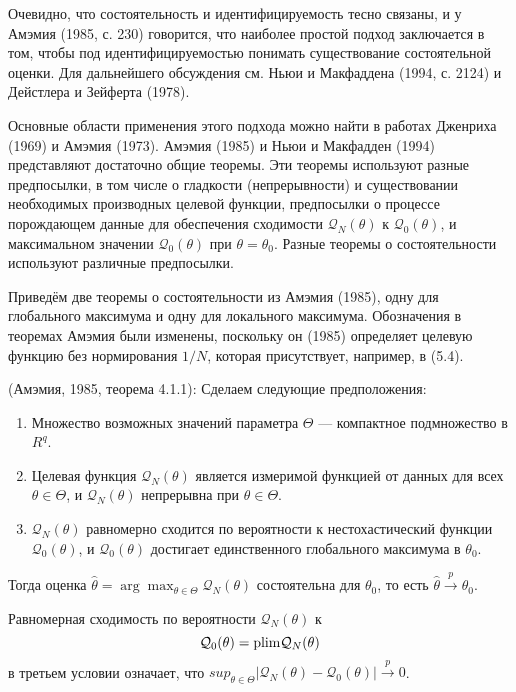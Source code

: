 Очевидно, что состоятельность и идентифицируемость тесно связаны, и у Амэмия (1985, с. 230) говорится, что наиболее простой подход заключается в том, чтобы под идентифицируемостью понимать существование состоятельной оценки. Для дальнейшего обсуждения см. Ньюи и Макфаддена (1994, с. 2124) и Дейстлера и Зейферта (1978).

Основные области применения этого подхода можно найти в работах Дженриха (1969) и Амэмия (1973). Амэмия (1985) и Ньюи и Макфадден (1994) представляют достаточно общие теоремы. Эти теоремы используют разные предпосылки, в том числе о гладкости (непрерывности) и существовании необходимых производных целевой функции, предпосылки о процессе порождающем данные для обеспечения сходимости $\mathcal{Q}_N(\theta)$  к $\mathcal{Q}_0(\theta)$, и максимальном значении $\mathcal{Q}_0(\theta)$  при $\theta=\theta_0$. Разные теоремы о состоятельности используют различные предпосылки.

Приведём две теоремы о состоятельности из Амэмия (1985), одну для глобального максимума и одну для локального максимума. Обозначения в теоремах Амэмия были изменены, поскольку он (1985) определяет целевую функцию без нормирования $1/N$, которая присутствует, например, в (5.4).

\begin{theorem} (Амэмия, 1985, теорема 4.1.1): 
Сделаем следующие предположения:
\begin{enumerate}
\item Множество возможных значений параметра $\Theta$ --- компактное подмножество в $R^q$.
\item Целевая функция $\mathcal{Q}_N(\theta)$ является измеримой функцией от данных для всех $\theta \in \Theta$, и $\mathcal{Q}_N(\theta)$ непрерывна при $\theta \in \Theta$.
\item $\mathcal{Q}_N(\theta)$ равномерно сходится по вероятности к нестохастический функции $\mathcal{Q}_0(\theta)$, и $\mathcal{Q}_0(\theta)$ достигает единственного глобального максимума в $\theta_0$.
\end{enumerate}

Тогда оценка $\hat{\theta}= \arg\max _{\theta \in \Theta} \mathcal{Q}_N(\theta)$ состоятельна для $\theta_0$, то есть $ \hat{\theta} \xrightarrow{p} \theta_0$.
\end{theorem}


Равномерная сходимость по вероятности $\mathcal{Q}_N(\theta)$ к 
\begin{equation}
\mathcal{Q}_0(\theta)=\mathrm{plim } \mathcal{Q}_N(\theta)
\end{equation}
в третьем условии означает, что $sup _{\theta \in \Theta} |\mathcal{Q}_N(\theta)-\mathcal{Q}_0(\theta)| \xrightarrow{p} 0$.

